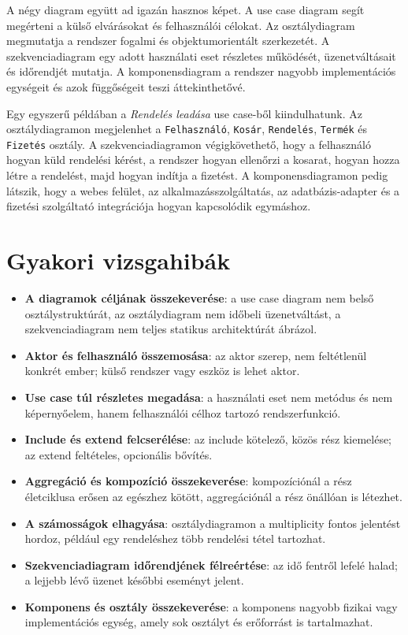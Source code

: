 A négy diagram együtt ad igazán hasznos képet. A use case diagram segít megérteni a külső elvárásokat és felhasználói célokat. Az osztálydiagram megmutatja a rendszer fogalmi és objektumorientált szerkezetét. A szekvenciadiagram egy adott használati eset részletes működését, üzenetváltásait és időrendjét mutatja. A komponensdiagram a rendszer nagyobb implementációs egységeit és azok függőségeit teszi áttekinthetővé.

Egy egyszerű példában a \textit{Rendelés leadása} use case-ből kiindulhatunk. Az osztálydiagramon megjelenhet a \texttt{Felhasználó}, \texttt{Kosár}, \texttt{Rendelés}, \texttt{Termék} és \texttt{Fizetés} osztály. A szekvenciadiagramon végigkövethető, hogy a felhasználó hogyan küld rendelési kérést, a rendszer hogyan ellenőrzi a kosarat, hogyan hozza létre a rendelést, majd hogyan indítja a fizetést. A komponensdiagramon pedig látszik, hogy a webes felület, az alkalmazásszolgáltatás, az adatbázis-adapter és a fizetési szolgáltató integrációja hogyan kapcsolódik egymáshoz.

\section{Gyakori vizsgahibák}

\begin{warningbox}
\begin{itemize}
  \item \textbf{A diagramok céljának összekeverése}: a use case diagram nem belső osztálystruktúrát, az osztálydiagram nem időbeli üzenetváltást, a szekvenciadiagram nem teljes statikus architektúrát ábrázol.
  \item \textbf{Aktor és felhasználó összemosása}: az aktor szerep, nem feltétlenül konkrét ember; külső rendszer vagy eszköz is lehet aktor.
  \item \textbf{Use case túl részletes megadása}: a használati eset nem metódus és nem képernyőelem, hanem felhasználói célhoz tartozó rendszerfunkció.
  \item \textbf{Include és extend felcserélése}: az include kötelező, közös rész kiemelése; az extend feltételes, opcionális bővítés.
  \item \textbf{Aggregáció és kompozíció összekeverése}: kompozíciónál a rész életciklusa erősen az egészhez kötött, aggregációnál a rész önállóan is létezhet.
  \item \textbf{A számosságok elhagyása}: osztálydiagramon a multiplicity fontos jelentést hordoz, például egy rendeléshez több rendelési tétel tartozhat.
  \item \textbf{Szekvenciadiagram időrendjének félreértése}: az idő fentről lefelé halad; a lejjebb lévő üzenet későbbi eseményt jelent.
  \item \textbf{Komponens és osztály összekeverése}: a komponens nagyobb fizikai vagy implementációs egység, amely sok osztályt és erőforrást is tartalmazhat.
\end{itemize}
\end{warningbox}

